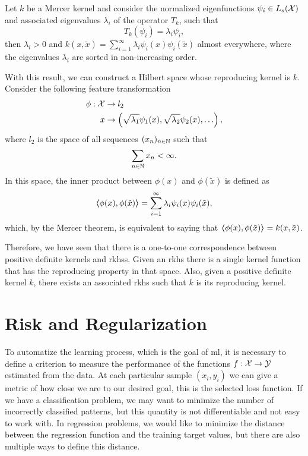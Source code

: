 \begin{theorem}    
Let $k$ be a Mercer kernel and consider the normalized eigenfunctions $\psi_i \in L_s(\mathcal{X})$ and associated eigenvalues $\lambda_i$ of the operator $T_k$, such that
$$ T_k(\psi_i) = \lambda_i \psi_i , $$
then $\lambda_i > 0$ and $k(x, \tilde{x}) = \sum_{i=1}^\infty \lambda_i \psi_i(x) \psi_i(\tilde{x})$ almost everywhere, where the eigenvalues $\lambda_i$ are sorted in non-increasing order. 
\end{theorem}
%
With this result, we can construct a Hilbert space whose reproducing kernel is $k$.
Consider the following feature transformation
\begin{equation}
    \begin{aligned}
        \nonumber
        \phi: \mathcal{X} &\to l_2 \\
        x &\to \left(\sqrt{\lambda_1} \psi_1(x), \sqrt{\lambda_2} \psi_2(x), \ldots \right) ,
    \end{aligned}
\end{equation}
where $l_2$ is the space of all sequences $(x_n)_{n \in \mathbb{N}}$ such that $$ \sum_{n \in \mathbb{N}} x_n < \infty .$$
In this space, the inner product between $\phi(x)$ and $\phi(\tilde{x})$ is defined as
$$ \bm{\left\langle} \phi(x), \phi(\tilde{x}) \bm{\right\rangle} = \sum_{i=1}^\infty \lambda_i \psi_i(x) \psi_i(\tilde{x}),$$ which, by the Mercer theorem, is equivalent to saying that $\bm{\left\langle} \phi(x), \phi(\tilde{x}) \bm{\right\rangle} = k(x, \tilde{x})$.

Therefore, we have seen that there is a one-to-one correspondence between positive definite kernels and \acrshort{rkhss}. Given an \acrshort{rkhs} there is a single kernel function that has the reproducing property in that space. Also, given a positive definite kernel $k$, there exists an associated \acrshort{rkhs} such that $k$ is its reproducing kernel. 











\section{Risk and Regularization}
To automatize the learning process, which is the goal of \acrshort{ml}, it is necessary to define a criterion to measure the performance of the functions $f: \mathcal{X} \to \mathcal{Y}$ estimated from the data.
At each particular sample $(x_i, y_i)$ we can give a metric of how close we are to our desired goal, this is the selected loss function. If we have a classification problem, we may want to minimize the number of incorrectly classified patterns, but this quantity is not differentiable and not easy to work with. In regression problems, we would like to minimize the distance between the regression function and the training target values, but there are also multiple ways to define this distance. 
%

